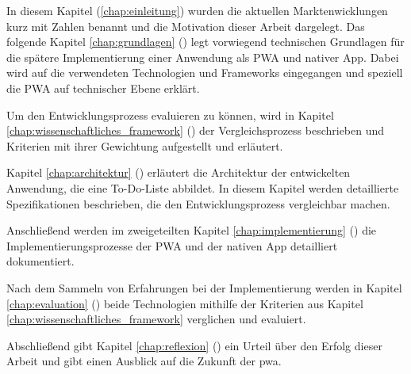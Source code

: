 In diesem Kapitel (\ref{chap:einleitung}) wurden die aktuellen Marktenwicklungen kurz mit Zahlen benannt und die Motivation dieser Arbeit dargelegt. Das folgende Kapitel \ref{chap:grundlagen} () legt vorwiegend technischen Grundlagen für die spätere Implementierung einer Anwendung als PWA und nativer App. Dabei wird auf die verwendeten Technologien und Frameworks eingegangen und speziell die PWA auf technischer Ebene erklärt. 

Um den Entwicklungsprozess evaluieren zu können, wird in Kapitel \ref{chap:wissenschaftliches_framework} () der Vergleichsprozess beschrieben und Kriterien mit ihrer Gewichtung aufgestellt und erläutert.

Kapitel \ref{chap:architektur} () erläutert die Architektur der entwickelten Anwendung, die eine To-Do-Liste abbildet. In diesem Kapitel werden detaillierte Spezifikationen beschrieben, die den Entwicklungsprozess vergleichbar machen. %

Anschließend werden im zweigeteilten Kapitel \ref{chap:implementierung} () die Implementierungsprozesse der PWA und der nativen App detailliert dokumentiert.

Nach dem Sammeln von Erfahrungen bei der Implementierung werden in Kapitel \ref{chap:evaluation} () beide Technologien mithilfe der Kriterien aus Kapitel \ref{chap:wissenschaftliches_framework} verglichen und evaluiert.

Abschließend gibt Kapitel \ref{chap:reflexion} () ein Urteil über den Erfolg dieser Arbeit und gibt einen Ausblick auf die Zukunft der \ac{pwa}.